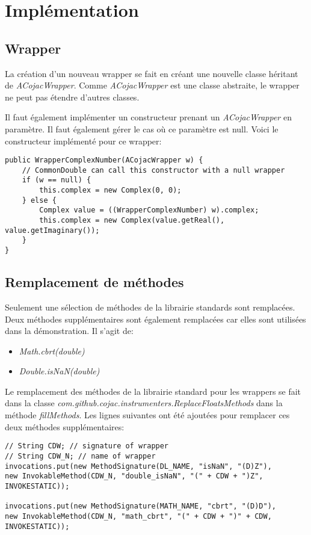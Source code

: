 \section{Implémentation}

\subsection{Wrapper}

La création d'un nouveau wrapper se fait en créant une nouvelle classe héritant de \textit{ACojacWrapper}. Comme \textit{ACojacWrapper} est une classe abstraite, le wrapper ne peut pas étendre d'autres classes.

Il faut également implémenter un constructeur prenant un \textit{ACojacWrapper} en paramètre. Il faut également gérer le cas où ce paramètre est null. Voici le constructeur implémenté pour ce wrapper:

\begin{verbatim}
public WrapperComplexNumber(ACojacWrapper w) {
    // CommonDouble can call this constructor with a null wrapper
    if (w == null) {
        this.complex = new Complex(0, 0);
    } else {
        Complex value = ((WrapperComplexNumber) w).complex;
        this.complex = new Complex(value.getReal(), value.getImaginary());
    }
}
\end{verbatim}

\subsection{Remplacement de méthodes}

Seulement une sélection de méthodes de la librairie standards sont remplacées. Deux méthodes supplémentaires sont également remplacées car elles sont utilisées dans la démonstration. Il s'agit de:
\begin{itemize}
    \item \textit{Math.cbrt(double)}
    \item \textit{Double.isNaN(double)}
\end{itemize}

Le remplacement des méthodes de la librairie standard pour les wrappers se fait dans la classe \textit{com.github.cojac.instrumenters.ReplaceFloatsMethods} dans la méthode \textit{fillMethods}. Les lignes suivantes ont été ajoutées pour remplacer ces deux méthodes supplémentaires:

\begin{verbatim}
// String CDW; // signature of wrapper
// String CDW_N; // name of wrapper
invocations.put(new MethodSignature(DL_NAME, "isNaN", "(D)Z"),
new InvokableMethod(CDW_N, "double_isNaN", "(" + CDW + ")Z", INVOKESTATIC));

invocations.put(new MethodSignature(MATH_NAME, "cbrt", "(D)D"),
new InvokableMethod(CDW_N, "math_cbrt", "(" + CDW + ")" + CDW, INVOKESTATIC));
\end{verbatim}

